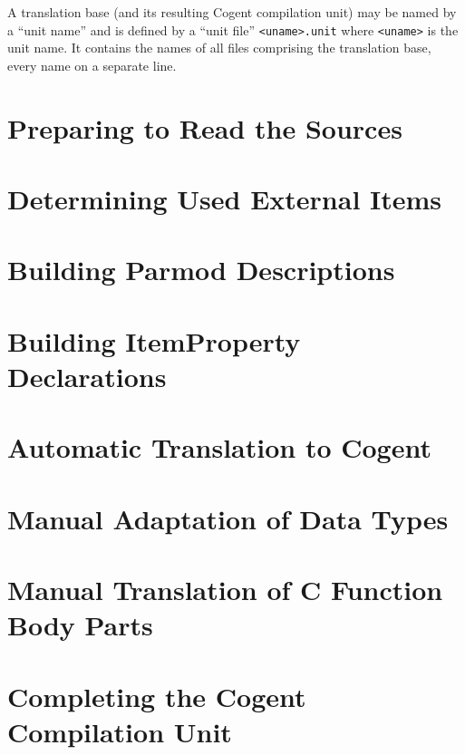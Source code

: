 \documentclass[a4paper]{report}
\newcommand{\code}[1]{\textnormal{\texttt{#1}}}
\begin{document}
A translation base (and its resulting Cogent compilation unit) may be named by a ``unit name'' and
is defined by a ``unit file'' \code{<uname>.unit} where \code{<uname>} is the unit name. It contains 
the names of all files comprising the translation base, every name on a separate line. 

\section{Preparing to Read the Sources}
\label{app-prep}
%

\section{Determining Used External Items}
\label{app-items}


\section{Building Parmod Descriptions}
\label{app-parmod}


\section{Building ItemProperty Declarations}
\label{app-itemprops}


\section{Automatic Translation to Cogent}
\label{app-transauto}


\section{Manual Adaptation of Data Types}
\label{app-transtype}


\section{Manual Translation of C Function Body Parts}
\label{app-transfunction}


\section{Completing the Cogent Compilation Unit}
\label{app-unit}
%
\end{document}
